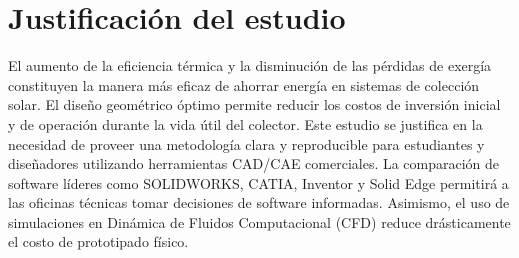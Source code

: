 \section{Justificación del estudio}
\label{sec:cap01_justificacion}

El aumento de la eficiencia térmica y la disminución de las pérdidas de exergía constituyen la manera más eficaz de ahorrar energía en sistemas de colección solar.
El diseño geométrico óptimo permite reducir los costos de inversión inicial y de operación durante la vida útil del colector.
Este estudio se justifica en la necesidad de proveer una metodología clara y reproducible para estudiantes y diseñadores utilizando herramientas CAD/CAE comerciales.
La comparación de software líderes como SOLIDWORKS, CATIA, Inventor y Solid Edge permitirá a las oficinas técnicas tomar decisiones de software informadas.
Asimismo, el uso de simulaciones en Dinámica de Fluidos Computacional (CFD) reduce drásticamente el costo de prototipado físico.
